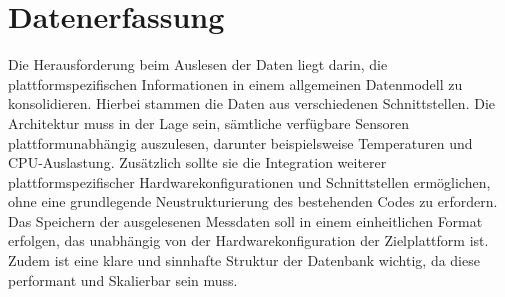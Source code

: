 \section{Datenerfassung}\label{sec:Datenerfassung}
Die Herausforderung beim Auslesen der Daten liegt darin, die plattformspezifischen Informationen in einem allgemeinen Datenmodell zu konsolidieren. Hierbei stammen die Daten aus verschiedenen Schnittstellen. Die Architektur muss in der Lage sein, sämtliche verfügbare Sensoren plattformunabhängig auszulesen, darunter beispielsweise Temperaturen und CPU-Auslastung. Zusätzlich sollte sie die Integration weiterer plattformspezifischer Hardwarekonfigurationen und Schnittstellen ermöglichen, ohne eine grundlegende Neustrukturierung des bestehenden Codes zu erfordern.\\
Das Speichern der ausgelesenen Messdaten soll in einem einheitlichen Format erfolgen, das unabhängig von der Hardwarekonfiguration der Zielplattform ist. Zudem ist eine klare und sinnhafte Struktur der Datenbank wichtig, da diese performant und Skalierbar sein muss.


